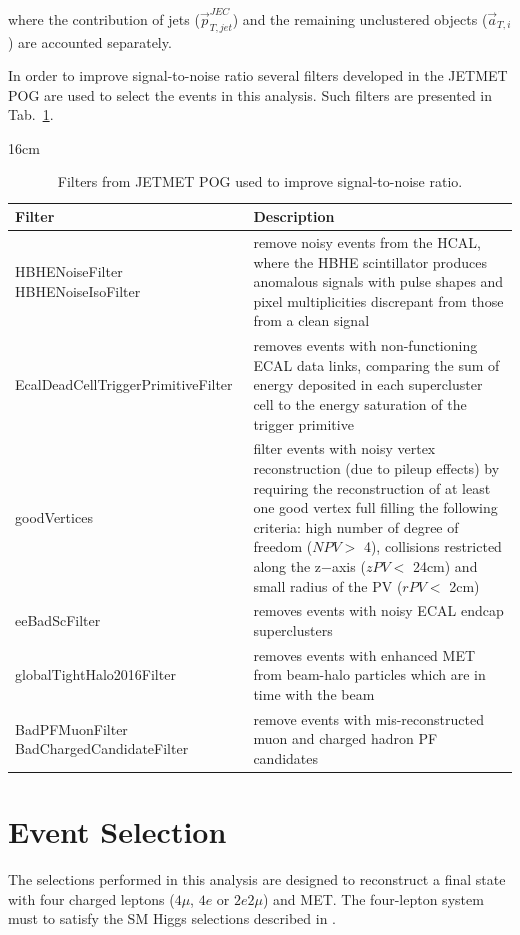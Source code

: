 where the contribution of jets ($\vec{p}_{T,jet}^{JEC}$) and the remaining unclustered objects ($\vec{a}_{T,i}$) are accounted separately.

In order to improve signal-to-noise ratio several filters developed in the JETMET POG \cite{bib:CMS-AN-16-442} are used to select the events in this analysis. Such filters are presented in Tab.~\ref{tab:jetmet_filters}.

\begin{table}[hbtp]{16cm}
	\caption{Filters from JETMET POG used to improve signal-to-noise ratio.}
	\centering
	\begin{tabular}{p{6cm}|p{9cm}}
		\hline
		Filter & Description\\
		\hline
		HBHENoiseFilter \hspace{3cm} HBHENoiseIsoFilter & remove noisy events from the HCAL, where the HBHE scintillator produces anomalous signals with pulse shapes and pixel multiplicities discrepant from those from a clean signal\\
		\hline
		EcalDeadCellTriggerPrimitiveFilter & removes events with non-functioning ECAL data links, comparing the sum of energy deposited in each supercluster cell to the energy saturation of the trigger primitive\\
		\hline
		goodVertices & filter events with noisy vertex reconstruction (due to pileup effects) by requiring the reconstruction of at least one good vertex full filling the following criteria: high number of degree of freedom ($NPV>$ 4), collisions restricted along the z−axis ($zPV<$ 24cm) and small radius of the PV ($rPV<$ 2cm)\\
		\hline
		eeBadScFilter & removes events with noisy ECAL endcap superclusters\\
		\hline
		globalTightHalo2016Filter & removes events with enhanced MET from beam-halo particles which are in time with the beam\\
		\hline
		BadPFMuonFilter \hspace{3cm} BadChargedCandidateFilter & remove events with mis-reconstructed muon and charged hadron PF candidates\\
		\hline
	\end{tabular}
	\label{tab:jetmet_filters}
\end{table}


\chapter{Event Selection}
\label{sec:event_selection}
The selections performed in this analysis are designed to reconstruct a final state with four charged leptons ($4\mu$, $4e$ or $2e2\mu$) and MET. The four-lepton system must to satisfy the SM Higgs selections described in \cite{bib:CMS-AN-16-442}. 

